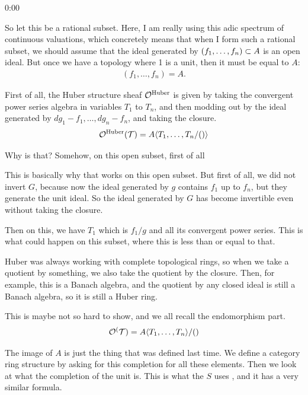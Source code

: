 \begin{unfinished}{0:00}
{\begin{theorem}
So let this be a rational subset.
Here, I am really using this adic spectrum of continuous valuations, which concretely means that when I form such a rational subset, we should assume that the ideal generated by $(f_1, \ldots, f_n) \subset A$ is an open ideal. But once we have a topology where 1 is a unit, then it must be equal to $A$:
\begin{align*}
(f_1, \ldots, f_n) = A.
\end{align*}

First of all, the Huber structure sheaf $\mathcal O^{\mathrm{Huber}}$ is given by taking the convergent power series algebra in variables $T_1$ to $T_n$, and then modding out by the ideal generated by $dg_1 - f_1, \ldots, dg_n - f_n$, and taking the closure.
\begin{align*}
\mathcal O^{\mathrm{Huber}} (\mathcal T) = A \langle T_1, \ldots, T_n / () \rangle
\end{align*}

Why is that? Somehow, on this open subset, first of all 

%
This is basically why that works on this open subset. But first of all, we did not invert $G$, because now the ideal generated by $g$ contains $f_1$ up to $f_n$, but they generate the unit ideal. So the ideal generated by $G$ has become invertible even without taking the closure. 

Then on this, we have $T_1$ which is $f_1/g$ and all its convergent power series. This is what could happen on this subset, where this is less than or equal to that.

Huber was always working with complete topological rings, so when we take a quotient by something, we also take the quotient by the closure. 
Then, for example, this is a Banach algebra, and the quotient by any closed ideal is still a Banach algebra, so it is still a Huber ring.

This is maybe not so hard to show, and we all recall the endomorphism part. 
\begin{align*}
\mathcal O^ (\mathcal T) = A \langle T_1, \ldots, T_n \rangle / ()
\end{align*}

The image of $A$ is just the thing that was defined last time. 
We define a category ring structure by asking for this completion for all these elements. 
Then we look at what the completion of the unit is. 
This is what the $S$ uses , and it has a very similar formula.


\end{theorem}}
\end{unfinished}
